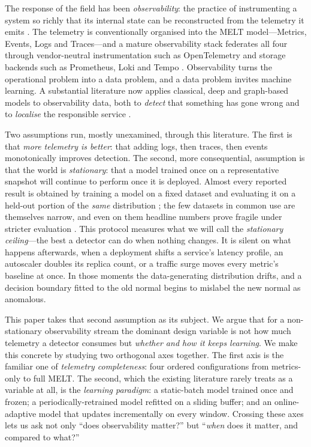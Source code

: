 \documentclass[acmsmall]{acmart}
\begin{document}
The response of the field has been \emph{observability}: the practice of instrumenting a system so richly that its internal state can be reconstructed from the telemetry it emits \cite{kosinska2023,boten2022}. The telemetry is conventionally organised into the MELT model---Metrics, Events, Logs and Traces---and a mature observability stack federates all four through vendor-neutral instrumentation such as OpenTelemetry and storage backends such as Prometheus, Loki and Tempo \cite{boten2022,chapman2023}. Observability turns the operational problem into a data problem, and a data problem invites machine learning. A substantial literature now applies classical, deep and graph-based models to observability data, both to \emph{detect} that something has gone wrong and to \emph{localise} the responsible service \cite{lomio2022,dkmak2025,han2024,wang2018,chen2025,raeiszadeh2026}.

Two assumptions run, mostly unexamined, through this literature. The first is that \emph{more telemetry is better}: that adding logs, then traces, then events monotonically improves detection. The second, more consequential, assumption is that the world is \emph{stationary}: that a model trained once on a representative snapshot will continue to perform once it is deployed. Almost every reported result is obtained by training a model on a fixed dataset and evaluating it on a held-out portion of the \emph{same} distribution \cite{lomio2022,dkmak2025,han2024}; the few datasets in common use are themselves narrow, and even on them headline numbers prove fragile under stricter evaluation \cite{landauer2022logsurvey,sarfraz2024quovadis}. This protocol measures what we will call the \emph{stationary ceiling}---the best a detector can do when nothing changes. It is silent on what happens afterwards, when a deployment shifts a service's latency profile, an autoscaler doubles its replica count, or a traffic surge moves every metric's baseline at once. In those moments the data-generating distribution drifts, and a decision boundary fitted to the old normal begins to mislabel the new normal as anomalous.

This paper takes that second assumption as its subject. We argue that for a non-stationary observability stream the dominant design variable is not how much telemetry a detector consumes but \emph{whether and how it keeps learning}. We make this concrete by studying two orthogonal axes together. The first axis is the familiar one of \emph{telemetry completeness}: four ordered configurations from metrics-only to full MELT. The second, which the existing literature rarely treats as a variable at all, is the \emph{learning paradigm}: a static-batch model trained once and frozen; a periodically-retrained model refitted on a sliding buffer; and an online-adaptive model that updates incrementally on every window. Crossing these axes lets us ask not only ``does observability matter?'' but ``\emph{when} does it matter, and compared to what?''
\end{document}
